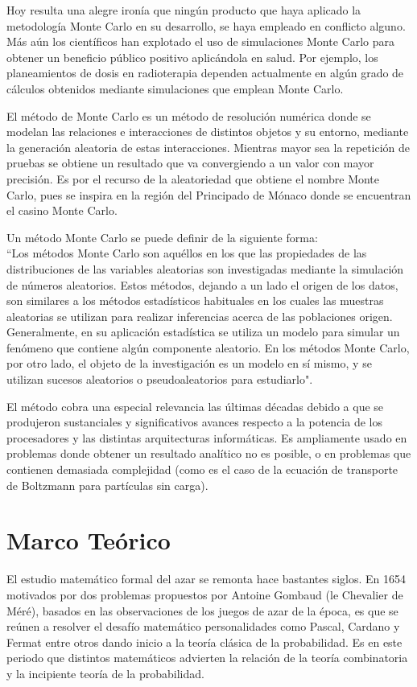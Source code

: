 \documentclass{rbf}
\begin{document}
Hoy resulta una alegre ironía que ningún producto que haya aplicado la metodología Monte Carlo en su desarrollo, se haya empleado en conflicto alguno. Más aún los científicos han explotado el uso de simulaciones Monte Carlo para obtener un beneficio público positivo aplicándola en salud. Por ejemplo, los planeamientos de dosis en radioterapia dependen actualmente en algún grado de cálculos obtenidos mediante simulaciones que emplean Monte Carlo.

El método de Monte Carlo es un método de resolución numérica donde se modelan las relaciones e interacciones de distintos objetos y su entorno, mediante la generación aleatoria de estas interacciones. Mientras mayor sea la repetición de pruebas se obtiene un resultado que va convergiendo a un valor con mayor precisión. Es por el recurso de la aleatoriedad que obtiene el nombre Monte Carlo, pues se inspira en la región del Principado de Mónaco donde se encuentran el casino Monte Carlo.

Un método Monte Carlo se puede definir de la siguiente forma: \\
``Los métodos Monte Carlo son aquéllos en los que las propiedades de las distribuciones de las variables aleatorias son investigadas mediante la simulación de números aleatorios. Estos métodos, dejando a un lado el origen de los datos, son similares a los métodos estadísticos habituales en los cuales las muestras aleatorias se utilizan para realizar inferencias acerca de las poblaciones origen. Generalmente, en su aplicación estadística se utiliza un modelo para simular un fenómeno que contiene algún componente aleatorio. En los métodos Monte Carlo, por otro lado, el objeto de la investigación es un modelo en sí mismo, y se utilizan sucesos aleatorios o pseudoaleatorios para estudiarlo".\cite{gent}

El método cobra una especial relevancia las últimas décadas debido a que se produjeron sustanciales y significativos avances respecto a la potencia de los procesadores y las distintas arquitecturas informáticas. Es ampliamente usado en problemas donde obtener un resultado analítico no es posible, o en problemas que contienen demasiada complejidad (como es el caso de la ecuación de transporte de Boltzmann para partículas sin carga).\cite{biela}
\section{Marco Teórico}
El estudio matemático formal del azar se remonta hace bastantes siglos. En 1654 motivados por dos problemas propuestos por Antoine Gombaud (le Chevalier de Méré), basados en las observaciones de los juegos de azar de la época, es que se reúnen a resolver el desafío matemático personalidades como Pascal, Cardano y Fermat entre otros dando inicio a la teoría clásica de la probabilidad. Es en este periodo que distintos matemáticos advierten la relación de la teoría combinatoria y la incipiente teoría de la probabilidad.
\end{document}
